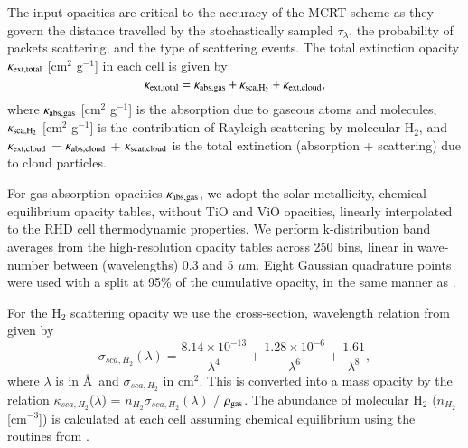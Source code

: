 \documentclass{aa}
\newcommand{\angstrom}{\textup{\AA}}
\begin{document}
The input opacities are critical to the accuracy of the MCRT scheme as they govern the distance travelled by the stochastically sampled $\tau_{\lambda}$, the probability of packets scattering, and the type of scattering events.
The total extinction opacity $\kappa_{\rm ext,total}$ [cm$^{2}$ g$^{-1}$] in each cell is given by
\begin{equation}
\label{eq:ktot}
 \kappa_{\rm ext, total} = \kappa_{\rm abs, gas}  + \kappa_{\rm sca, H_{2}}  + \kappa_{\rm ext, cloud}, 
\end{equation}
where $\kappa_{\rm abs, gas}$ [cm$^{2}$ g$^{-1}$] is the absorption due to gaseous atoms and molecules, $\kappa_{\rm sca, H_{2}}$ [cm$^{2}$ g$^{-1}$] is the contribution of Rayleigh scattering by molecular H$_{2}$, and $\kappa_{\rm ext, cloud}$ = $\kappa_{\rm abs, cloud}$ + $\kappa_{\rm scat, cloud}$ is the total extinction (absorption + scattering) due to cloud particles.

For gas absorption opacities $\kappa_{\rm abs, gas}$, we adopt the solar metallicity, chemical equilibrium \citet{Sharp2007} opacity tables, without TiO and ViO opacities, linearly interpolated to the RHD cell thermodynamic properties.
We perform k-distribution \citep[e.g.][]{Goody1989,Lacis1991,Grimm2015} band averages from the high-resolution opacity tables across 250 bins, linear in wave-number between (wavelengths) 0.3 and 5 $\mu$m.
Eight Gaussian quadrature points were used with a split at 95\% of the cumulative opacity, in the same manner as \citet{Showman2009}.

For the H$_{2}$ scattering opacity we use the cross-section, wavelength relation from \citet{Dalgarno1962} given by
\begin{equation}
\sigma_{sca, H_{2}}(\lambda) = \frac{8.14 \times 10^{-13}}{\lambda^{4}} + \frac{1.28 \times 10^{-6}}{\lambda^{6}} + \frac{1.61}{\lambda^{8}} ,
\end{equation}
where $\lambda$ is in \angstrom\ and $\sigma_{sca, H_{2}}$ in cm$^{2}$.
This is converted into a mass opacity by the relation $\kappa_{sca, H_{2}}$($\lambda$) = $n_{H_{2}}$$\sigma_{sca, H_{2}}(\lambda)$ / $\rho_{\rm gas}$.
The abundance of molecular H$_{2}$ ($n_{H_{2}}$ [cm$^{-3}$])  is calculated at each cell assuming chemical equilibrium using the routines from \citet{Helling2016}.
\end{document}
